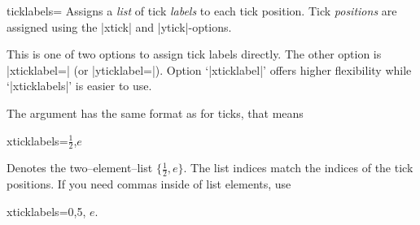 \begin{pgfplotsxykey}{\x ticklabels=}
\label{pgfplots:key:xticklabels}%
Assigns a \emph{list} of tick \emph{labels} to each tick position. Tick \emph{positions} are assigned using the |xtick| and |ytick|-options.

This is one of two options to assign tick labels directly. The other option is |xticklabel=| (or |yticklabel=|).
Option `|xticklabel|' offers higher flexibility while `|xticklabels|' is easier to use.

The argument  has the same format as for ticks, that means
\begin{codeexample}
xticklabels={$\frac{1}{2}$,$e$}
\end{codeexample}
Denotes the two--element--list $\{\frac 12, e\}$. The list indices match the indices of the tick positions. If you need commas inside of list elements, use 
\begin{codeexample}
xticklabels={{0,5}, $e$}.
\end{codeexample}


\begin{codeexample}[]
\end{codeexample}

\begin{codeexample}[]
\end{codeexample}
\end{pgfplotsxykey}



